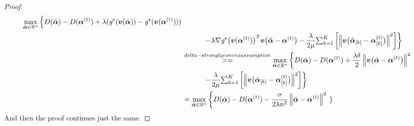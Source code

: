 \begin{proof}
\begin{align*}
\max_{ \hat \av \in \R^{n}}
 \left\{
  D(\hat \av)
  -D(\av^{(t)})
 +\lambda (\dualreg(\vv(\hat\av)) - \dualreg(\vv(\av^{(t)})))
  \right. \\ &\quad\quad\quad \left.
 -\lambda\nabla\dualreg\big(\vv(\av^{(t)})\big)^T \vv\big(\hat\av -\av^{(t)}\big)
-\frac{\lambda}{2\mu}  \textstyle{\sum}_{k=1}^K
\left[
 \norm{\vv\big(\hat\av_{[k]}-\av_{[k]}^{(t)}\big)}^2
\right] \right\}
\\
&\overset{delta-stronglyconvex assumption}{>=} %
\max_{ \hat \av \in \R^{n}}
 \left\{
  D(\hat \av)
  -D(\av^{(t)})
 +\frac{\lambda\delta}{2}\norm{\vv\big(\hat\av-\av^{(t)}\big)}^2
  \right. \\ &\quad\quad\quad \left.
-\frac{\lambda}{2\mu}  \textstyle{\sum}_{k=1}^K
\left[
 \norm{\vv\big(\hat\av_{[k]}-\av_{[k]}^{(t)}\big)}^2
\right] \right\}
\\
&= %
\max_{ \hat \av \in \R^{n}}
 \left\{
  D(\hat \av)
  -D(\av^{(t)})
 - \frac{\sigma}{2\lambda n^2} \norm{\hat\av-\av^{(t)}}^2
  \right. \left.
 \right\}
\end{align*}
And then the proof continues just the same.
\end{proof}